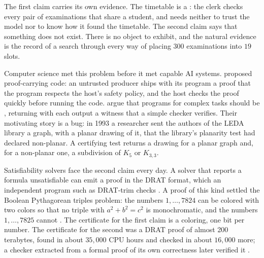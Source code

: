 \begin{refsection}
The first claim carries its own evidence. The timetable is a : the clerk checks every pair of examinations that share a student, and needs neither to trust the model nor to know how it found the timetable. The second claim says that something does not exist. There is no object to exhibit, and the natural evidence is the record of a search through every way of placing $300$ examinations into $19$ slots.

Computer science met this problem before it met capable AI systems. \Textcite{Necula1997} proposed proof-carrying code: an untrusted producer ships with its program a proof that the program respects the host's safety policy, and the host checks the proof quickly before running the code. \Textcite{McConnellEtAl2011} argue that programs for complex tasks should be , returning with each output a witness that a simple checker verifies. Their motivating story is a bug: in 1993 a researcher sent the authors of the LEDA library a graph, with a planar drawing of it, that the library's planarity test had declared non-planar. A certifying test returns a drawing for a planar graph and, for a non-planar one, a subdivision of $K_5$ or $K_{3,3}$.

Satisfiability solvers face the second claim every day. A solver that reports a formula unsatisfiable can emit a proof in the DRAT format, which an independent program such as DRAT-trim checks \parencite{WetzlerHeuleHunt2014}. A proof of this kind settled the Boolean Pythagorean triples problem: the numbers $1,\dots,7824$ can be colored with two colors so that no triple with $a^2+b^2=c^2$ is monochromatic, and the numbers $1,\dots,7825$ cannot \parencite{HeuleKullmannMarek2016}. The certificate for the first claim is a coloring, one bit per number. The certificate for the second was a DRAT proof of almost 200 terabytes, found in about $35{,}000$ CPU hours and checked in about $16{,}000$ more; a checker extracted from a formal proof of its own correctness later verified it \parencite{CruzFilipeEtAl2017}.


\end{refsection}
